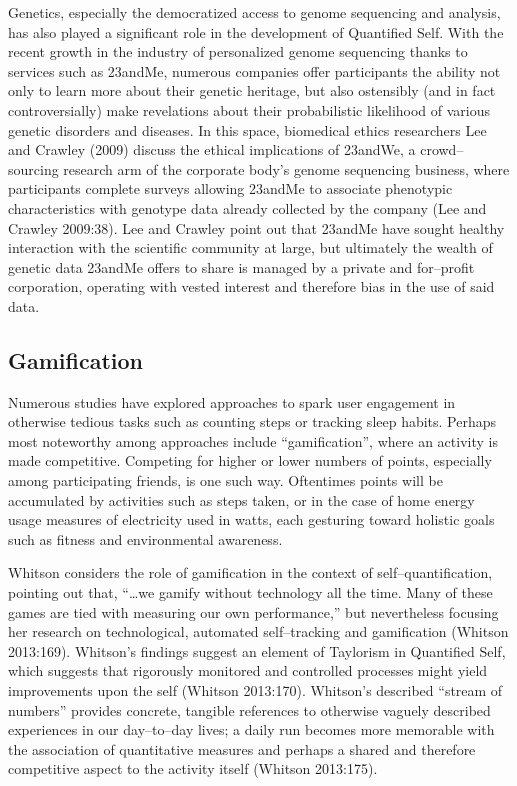 \documentclass{article}
\begin{document}
Genetics,
especially the democratized access to genome sequencing and analysis,
has also played a significant role in the development of Quantified Self.
With the recent growth in the industry of personalized genome sequencing thanks to services such as 23andMe,
numerous companies offer participants the ability not only to learn more about their genetic heritage,
but also ostensibly (and in fact controversially) make revelations about their probabilistic likelihood of various genetic  disorders and diseases.
In this space,
biomedical ethics researchers Lee and Crawley (2009) discuss the ethical implications of 23andWe, 
a crowd--sourcing research arm of the corporate body's genome sequencing business,
where participants complete surveys allowing 23andMe to associate phenotypic characteristics with genotype data already collected by the company
(Lee and Crawley 2009:38). 
Lee and Crawley point out that 23andMe have sought healthy interaction with the scientific community at large,
but ultimately the wealth of genetic data 23andMe offers to share is managed by a private and for--profit corporation,
operating with vested interest and therefore bias in the use of said data.

\subsection*{Gamification}
Numerous studies have explored approaches to spark user engagement in otherwise tedious tasks such as counting steps or tracking sleep habits.
Perhaps most noteworthy among approaches include ``gamification'',
where an activity is made competitive.
Competing for higher or lower numbers of points,
especially among participating friends,
is one such way.
Oftentimes points will be accumulated by activities such as steps taken,
or in the case of home energy usage measures of electricity used in watts,
each gesturing toward holistic goals such as fitness and environmental awareness.

Whitson considers the role of gamification in the context of self--quantification,
pointing out that,
``\dots we gamify without technology all the time.
Many of these games are tied with measuring our own performance,'' but nevertheless focusing her research on technological,
automated self--tracking and gamification
(Whitson 2013:169). 
Whitson's findings suggest an element of Taylorism in Quantified Self,
which suggests that rigorously monitored and controlled processes might yield improvements upon the self
(Whitson 2013:170). 
Whitson's described ``stream of numbers'' provides concrete,
tangible references to otherwise vaguely described experiences in our day--to--day lives;
a daily run becomes more memorable with the association of quantitative measures and perhaps a shared and therefore competitive aspect to the activity itself
(Whitson 2013:175). 
\end{document}
